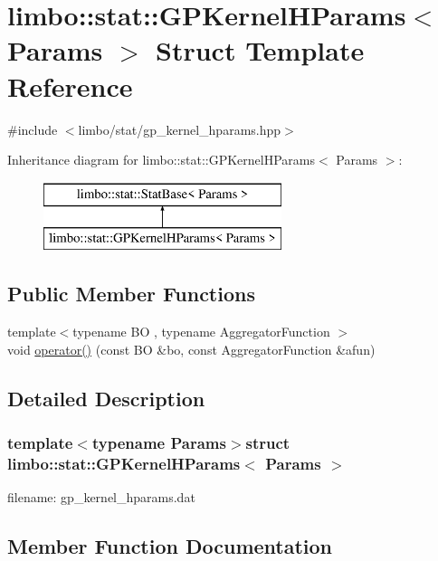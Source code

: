 \hypertarget{structlimbo_1_1stat_1_1_g_p_kernel_h_params}{}\section{limbo\+:\+:stat\+:\+:G\+P\+Kernel\+H\+Params$<$ Params $>$ Struct Template Reference}
\label{structlimbo_1_1stat_1_1_g_p_kernel_h_params}


{\ttfamily \#include $<$limbo/stat/gp\+\_\+kernel\+\_\+hparams.\+hpp$>$}

Inheritance diagram for limbo\+:\+:stat\+:\+:G\+P\+Kernel\+H\+Params$<$ Params $>$\+:\begin{figure}[H]
\begin{center}
\leavevmode
\includegraphics[height=2.000000cm]{structlimbo_1_1stat_1_1_g_p_kernel_h_params}
\end{center}
\end{figure}
\subsection*{Public Member Functions}
\begin{DoxyCompactItemize}
\item 
{\footnotesize template$<$typename B\+O , typename Aggregator\+Function $>$ }\\void \hyperlink{structlimbo_1_1stat_1_1_g_p_kernel_h_params_aa69a6377279cb199ec043ad98b9d5db7}{operator()} (const B\+O \&bo, const Aggregator\+Function \&afun)
\end{DoxyCompactItemize}


\subsection{Detailed Description}
\subsubsection*{template$<$typename Params$>$struct limbo\+::stat\+::\+G\+P\+Kernel\+H\+Params$<$ Params $>$}

filename\+: {\ttfamily gp\+\_\+kernel\+\_\+hparams.\+dat} 

\subsection{Member Function Documentation}
\hypertarget{structlimbo_1_1stat_1_1_g_p_kernel_h_params_aa69a6377279cb199ec043ad98b9d5db7}{}
